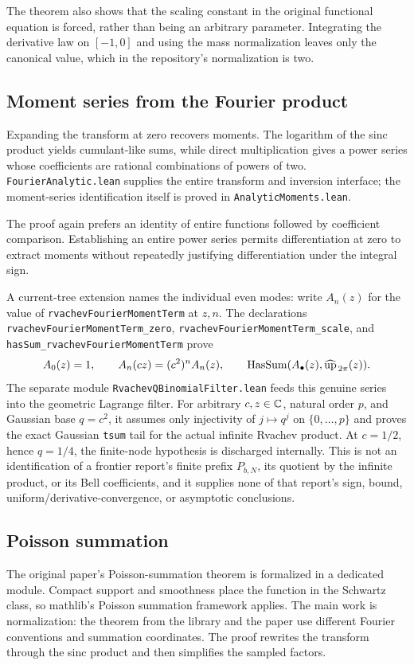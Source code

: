 \documentclass[11pt,oneside]{article}
\theoremstyle{definition}
\theoremstyle{remark}
\begin{document}
The theorem also shows that the scaling constant in the original functional equation is forced, rather than being an arbitrary parameter.  Integrating the derivative law on \([-1,0]\) and using the mass normalization leaves only the canonical value, which in the repository's normalization is two.

\subsection{Moment series from the Fourier product}
Expanding the transform at zero recovers moments.  The logarithm of the sinc product yields cumulant-like sums, while direct multiplication gives a power series whose coefficients are rational combinations of powers of two.  \nolinkurl{FourierAnalytic.lean} supplies the entire transform and inversion interface; the moment-series identification itself is proved in \nolinkurl{AnalyticMoments.lean}.

The proof again prefers an identity of entire functions followed by coefficient comparison.  Establishing an entire power series permits differentiation at zero to extract moments without repeatedly justifying differentiation under the integral sign.

A current-tree extension names the individual even modes: write \(A_n(z)\) for
the value of \nolinkurl{rvachevFourierMomentTerm} at \(z,n\).  The declarations
\nolinkurl{rvachevFourierMomentTerm_zero},
\nolinkurl{rvachevFourierMomentTerm_scale}, and
\nolinkurl{hasSum_rvachevFourierMomentTerm} prove
\[
  A_0(z)=1,\qquad A_n(cz)=(c^2)^nA_n(z),\qquad
  \operatorname{HasSum}(A_\bullet(z),\widehat{\operatorname{up}}_{\,2\pi}(z)).
\]
The separate module \nolinkurl{RvachevQBinomialFilter.lean} feeds this genuine
series into the geometric Lagrange filter.  For arbitrary \(c,z\in\mathbb{C}\), natural
order \(p\), and Gaussian base \(q=c^2\), it assumes only injectivity of
\(j\mapsto q^j\) on \(\{0,\ldots,p\}\) and proves the exact Gaussian
\nolinkurl{tsum} tail for the actual infinite Rvachev product.  At
\(c=1/2\), hence \(q=1/4\), the finite-node hypothesis is discharged
internally.  This is not an identification of a frontier report's finite
prefix \(P_{b,N}\), its quotient by the infinite product, or its Bell
coefficients, and it supplies none of that report's sign, bound,
uniform/derivative-convergence, or asymptotic conclusions.

\subsection{Poisson summation}
The original paper's Poisson-summation theorem is formalized in a dedicated module.  Compact support and smoothness place the function in the Schwartz class, so mathlib's Poisson summation framework applies.  The main work is normalization: the theorem from the library and the paper use different Fourier conventions and summation coordinates.  The proof rewrites the transform through the sinc product and then simplifies the sampled factors.
\end{document}

